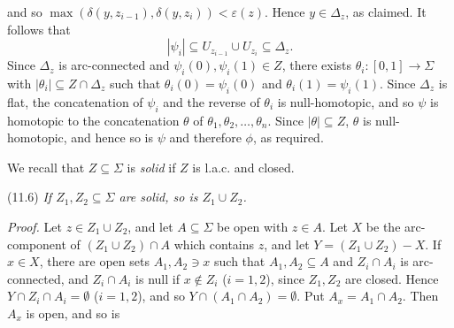 and so $\max(\delta(y, z_{i-1}), \delta(y, z_i)) < \varepsilon(z)$. Hence $y \in \Delta_z$, as claimed. It follows that
\begin{equation*}
|\psi_i| \subseteq U_{z_{i-1}} \cup U_{z_i} \subseteq \Delta_z.
\end{equation*}
Since $\Delta_z$ is arc-connected and $\psi_i(0), \psi_i(1) \in Z$, there exists $\theta_i \colon [0, 1] \to \Sigma$ with $|\theta_i| \subseteq Z \cap \Delta_z$ such that $\theta_i(0) = \psi_i(0)$ and $\theta_i(1) = \psi_i(1)$. Since $\Delta_z$ is flat, the concatenation of $\psi_i$ and the reverse of $\theta_i$ is null-homotopic, and so $\psi$ is homotopic to the concatenation $\theta$ of $\theta_1, \theta_2, \dots, \theta_n$. Since $|\theta| \subseteq Z$, $\theta$ is null-homotopic, and hence so is $\psi$ and therefore $\phi$, as required.

We recall that $Z \subseteq \Sigma$ is \textit{solid} if $Z$ is l.a.c. and closed.

\stmt
(11.6) \textit{If $Z_1, Z_2 \subseteq \Sigma$ are solid, so is $Z_1 \cup Z_2$.}

\textit{Proof.} Let $z \in Z_1 \cup Z_2$, and let $A \subseteq \Sigma$ be open with $z \in A$. Let $X$ be the arc-component of $(Z_1 \cup Z_2) \cap A$ which contains $z$, and let $Y = (Z_1 \cup Z_2) - X$. If $x \in X$, there are open sets $A_1, A_2 \ni x$ such that $A_1, A_2 \subseteq A$ and $Z_i \cap A_i$ is arc-connected, and $Z_i \cap A_i$ is null if $x \notin Z_i$ ($i = 1, 2$), since $Z_1, Z_2$ are closed. Hence $Y \cap Z_i \cap A_i = \emptyset$ ($i = 1, 2$), and so $Y \cap (A_1 \cap A_2) = \emptyset$. Put $A_x = A_1 \cap A_2$. Then $A_x$ is open, and so is
